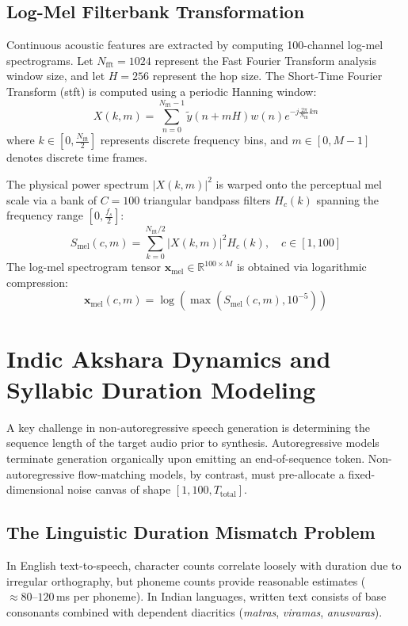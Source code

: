 \subsection{Log-Mel Filterbank Transformation}
Continuous acoustic features are extracted by computing 100-channel log-mel spectrograms. Let $N_{\text{fft}} = 1024$ represent the Fast Fourier Transform analysis window size, and let $H = 256$ represent the hop size. The Short-Time Fourier Transform (\acrshort{stft}) is computed using a periodic Hanning window:
\begin{equation}
    X(k, m) = \sum_{n=0}^{N_{\text{fft}}-1} \tilde{y}(n + mH) w(n) e^{-j \frac{2\pi}{N_{\text{fft}}} kn}
    \label{eq:stft_analysis}
\end{equation}
where $k \in [0, \frac{N_{\text{fft}}}{2}]$ represents discrete frequency bins, and $m \in [0, M-1]$ denotes discrete time frames. 

The physical power spectrum $|X(k, m)|^2$ is warped onto the perceptual mel scale via a bank of $C = 100$ triangular bandpass filters $H_c(k)$ spanning the frequency range $[0, \frac{f_s}{2}]$:
\begin{equation}
    S_{\text{mel}}(c, m) = \sum_{k=0}^{N_{\text{fft}}/2} |X(k, m)|^2 H_c(k), \quad c \in [1, 100]
    \label{eq:mel_filterbank}
\end{equation}
The log-mel spectrogram tensor $\mathbf{x}_{\text{mel}} \in \mathbb{R}^{100 \times M}$ is obtained via logarithmic compression:
\begin{equation}
    \mathbf{x}_{\text{mel}}(c, m) = \log\left( \max\left( S_{\text{mel}}(c, m), 10^{-5} \right) \right)
    \label{eq:log_compression}
\end{equation}

\section{Indic Akshara Dynamics and Syllabic Duration Modeling}
\label{sec:duration_modeling}
A key challenge in non-autoregressive speech generation is determining the sequence length of the target audio prior to synthesis. Autoregressive models terminate generation organically upon emitting an end-of-sequence token. Non-autoregressive flow-matching models, by contrast, must pre-allocate a fixed-dimensional noise canvas of shape $[1, 100, T_{\text{total}}]$.

\subsection{The Linguistic Duration Mismatch Problem}
In English text-to-speech, character counts correlate loosely with duration due to irregular orthography, but phoneme counts provide reasonable estimates ($\approx 80\text{--}120$\,ms per phoneme). In Indian languages, written text consists of base consonants combined with dependent diacritics (\textit{matras}, \textit{viramas}, \textit{anusvaras}). 

